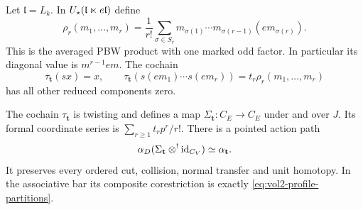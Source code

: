 Let $\mathfrak l=L_k$. In $U_{\star}(\mathfrak l\ltimes e\mathfrak l)$
define
\begin{equation}\label{eq:vol2-marked-PBW}
 \rho_r(m_1,\ldots,m_r)=\frac1{r!}\sum_{\sigma\in S_r}
       m_{\sigma(1)}\cdots m_{\sigma(r-1)}(em_{\sigma(r)}).
\end{equation}
This is the averaged PBW product with one marked odd factor.
In particular its diagonal value is $m^{r-1}em$. The cochain
\[
 \tau_{\mathbf t}(sx)=x,\qquad
 \tau_{\mathbf t}(s(em_1)\cdots s(em_r))=t_r\rho_r(m_1,\ldots,m_r)
\]
has all other reduced components zero.

\begin{proposition}\label{prop:vol2-profile-actor}
The cochain $\tau_{\mathbf t}$ is twisting and defines a map
$\Sigma_{\mathbf t}:C_E\to C_E$ under and over $J$.
Its formal coordinate series is
$\sum_{r\geq1}t_rp^r/r!$. There is a pointed action path
\begin{equation}\label{eq:vol2-profile-comparison}
 \alpha_D(\Sigma_{\mathbf t}\mathbin{\otimes^!}\mathrm{id}_{C_V})
                    \simeq\alpha_{\mathbf t}.
\end{equation}
It preserves every ordered cut, collision, normal transfer and unit
homotopy. In the associative bar its composite corestriction is
exactly \eqref{eq:vol2-profile-partitions}.
\end{proposition}

